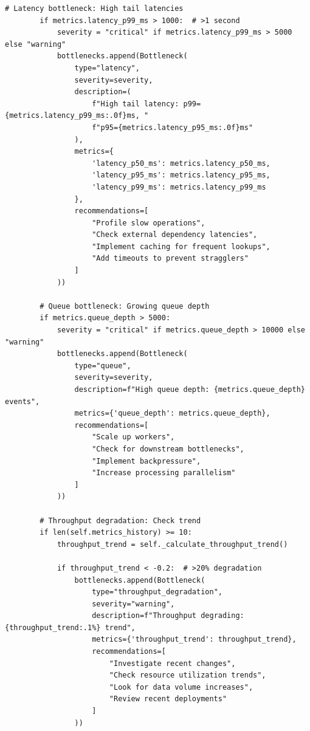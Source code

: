 \begin{lstlisting}[style=python, caption={Performance Monitor with Bottleneck Detection}]
        # Latency bottleneck: High tail latencies
        if metrics.latency_p99_ms > 1000:  # >1 second
            severity = "critical" if metrics.latency_p99_ms > 5000 else "warning"
            bottlenecks.append(Bottleneck(
                type="latency",
                severity=severity,
                description=(
                    f"High tail latency: p99={metrics.latency_p99_ms:.0f}ms, "
                    f"p95={metrics.latency_p95_ms:.0f}ms"
                ),
                metrics={
                    'latency_p50_ms': metrics.latency_p50_ms,
                    'latency_p95_ms': metrics.latency_p95_ms,
                    'latency_p99_ms': metrics.latency_p99_ms
                },
                recommendations=[
                    "Profile slow operations",
                    "Check external dependency latencies",
                    "Implement caching for frequent lookups",
                    "Add timeouts to prevent stragglers"
                ]
            ))

        # Queue bottleneck: Growing queue depth
        if metrics.queue_depth > 5000:
            severity = "critical" if metrics.queue_depth > 10000 else "warning"
            bottlenecks.append(Bottleneck(
                type="queue",
                severity=severity,
                description=f"High queue depth: {metrics.queue_depth} events",
                metrics={'queue_depth': metrics.queue_depth},
                recommendations=[
                    "Scale up workers",
                    "Check for downstream bottlenecks",
                    "Implement backpressure",
                    "Increase processing parallelism"
                ]
            ))

        # Throughput degradation: Check trend
        if len(self.metrics_history) >= 10:
            throughput_trend = self._calculate_throughput_trend()

            if throughput_trend < -0.2:  # >20% degradation
                bottlenecks.append(Bottleneck(
                    type="throughput_degradation",
                    severity="warning",
                    description=f"Throughput degrading: {throughput_trend:.1%} trend",
                    metrics={'throughput_trend': throughput_trend},
                    recommendations=[
                        "Investigate recent changes",
                        "Check resource utilization trends",
                        "Look for data volume increases",
                        "Review recent deployments"
                    ]
                ))


\end{lstlisting}
